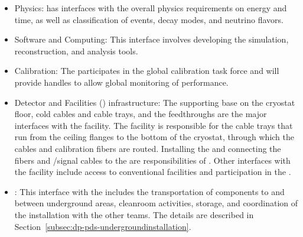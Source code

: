 \begin{itemize}
\item \dune Physics: \dual {} has interfaces with the overall physics requirements on energy and time, as well as classification of events, decay modes, and neutrino flavors.

\item Software and Computing: This interface involves developing the simulation, reconstruction, and analysis tools.

\item Calibration: The  participates in the  global calibration task force and will provide handles to allow global monitoring of  performance.

\item Detector and Facilities () infrastructure: The 
 supporting base on the cryostat floor, cold cables and cable trays, and the feedthroughs are the major interfaces with the facility. The facility is responsible for the cable trays that run from the ceiling \fdth flanges to the bottom of the cryostat, through which the cables and calibration fibers are routed. Installing the  and connecting the fibers and /signal cables to the  are responsibilities of . Other interfaces with the facility include access to conventional facilities and participation in the .

\item {}: This interface with the  includes the transportation of  components to and between underground areas, cleanroom activities, storage, and coordination of the installation with the other teams. The details are described in Section~\ref{subsec:dp-pds-undergroundinstallation}.

\end{itemize}

